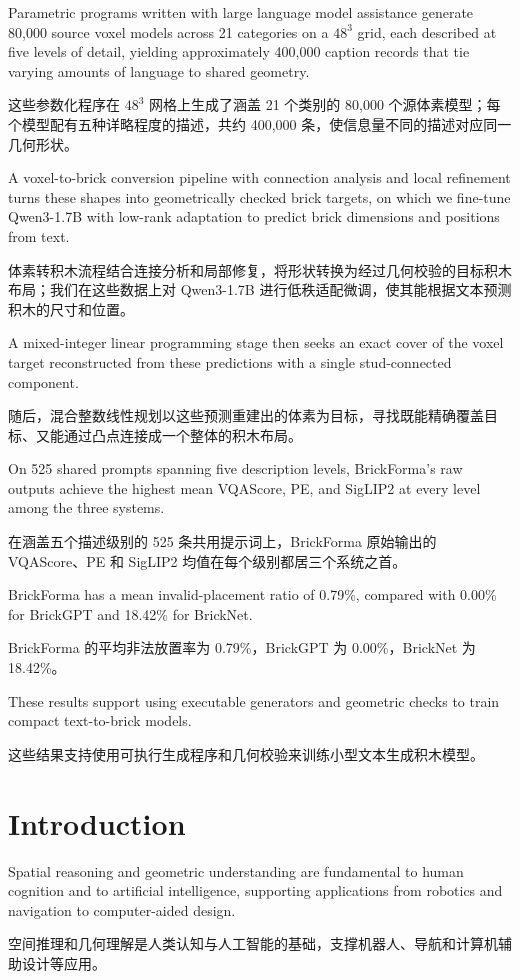 \documentclass[11pt,letterpaper]{article}
\newcommand{\zh}[1]{{\chinesefont #1}}
\newcommand{\pair}[2]{\par\addvspace{4pt}\noindent
  \begin{minipage}{\linewidth}\raggedright
  #1\par\nobreak\vspace{1pt}
  {\color{translation}\chinesefont\fontsize{10.5}{15.3}\selectfont #2\par}
  \end{minipage}\par}
\begin{document}
\pair{Parametric programs written with large language model assistance generate 80,000 source voxel models across 21 categories on a $48^3$ grid, each described at five levels of detail, yielding approximately 400,000 caption records that tie varying amounts of language to shared geometry.}{这些参数化程序在 $48^3$ 网格上生成了涵盖 21 个类别的 80,000 个源体素模型；每个模型配有五种详略程度的描述，共约 400,000 条，使信息量不同的描述对应同一几何形状。}

\pair{A voxel-to-brick conversion pipeline with connection analysis and local refinement turns these shapes into geometrically checked brick targets, on which we fine-tune Qwen3-1.7B with low-rank adaptation to predict brick dimensions and positions from text.}{体素转积木流程结合连接分析和局部修复，将形状转换为经过几何校验的目标积木布局；我们在这些数据上对 Qwen3-1.7B 进行低秩适配微调，使其能根据文本预测积木的尺寸和位置。}

\pair{A mixed-integer linear programming stage then seeks an exact cover of the voxel target reconstructed from these predictions with a single stud-connected component.}{随后，混合整数线性规划以这些预测重建出的体素为目标，寻找既能精确覆盖目标、又能通过凸点连接成一个整体的积木布局。}

\pair{On 525 shared prompts spanning five description levels, BrickForma's raw outputs achieve the highest mean VQAScore, PE, and SigLIP2 at every level among the three systems.}{在涵盖五个描述级别的 525 条共用提示词上，BrickForma 原始输出的 VQAScore、PE 和 SigLIP2 均值在每个级别都居三个系统之首。}

\pair{BrickForma has a mean invalid-placement ratio of 0.79\%, compared with 0.00\% for BrickGPT and 18.42\% for BrickNet.}{BrickForma 的平均非法放置率为 0.79\%，BrickGPT 为 0.00\%，BrickNet 为 18.42\%。}

\pair{These results support using executable generators and geometric checks to train compact text-to-brick models.}{这些结果支持使用可执行生成程序和几何校验来训练小型文本生成积木模型。}

\section{Introduction\enspace\zh{引言}}

\pair{Spatial reasoning and geometric understanding are fundamental to human cognition and to artificial intelligence, supporting applications from robotics and navigation to computer-aided design.}{空间推理和几何理解是人类认知与人工智能的基础，支撑机器人、导航和计算机辅助设计等应用。}
\end{document}
